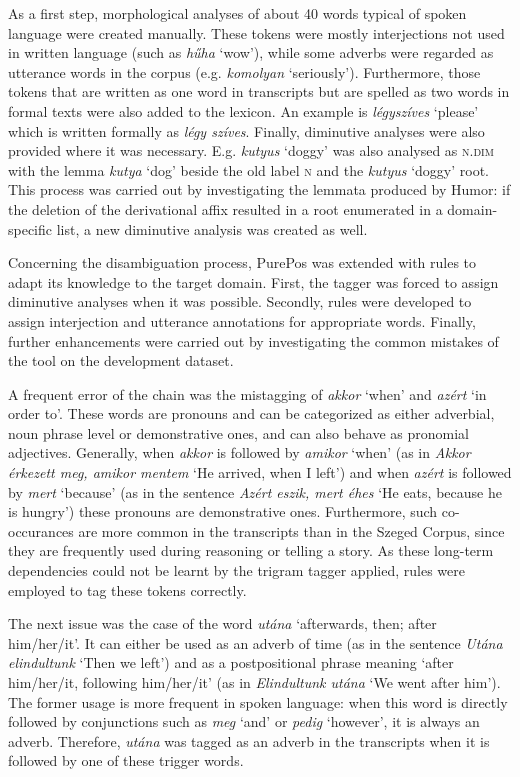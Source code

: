 As a first step, morphological analyses of about 40 words typical of spoken language were created manually. 
These tokens were mostly interjections not used in written language (such as \textit{hűha} `wow’), while some adverbs were regarded as utterance words in the corpus (e.g. \textit{komolyan} `seriously’). 
Furthermore, those tokens that are written as one word in transcripts but are spelled as two words in formal texts were also added to the lexicon. 
An example is \textit{légyszíves} `please’ which is written formally as \textit{légy szíves}. Finally, diminutive analyses were also provided where it was necessary. 
E.g. \textit{kutyus} `doggy’ was also analysed as \textsc{n.dim} with the lemma \textit{kutya} `dog’ beside the old label \textsc{n} and the \textit{kutyus} `doggy’ root. This process was carried out by investigating the lemmata produced by Humor: if the deletion of the derivational affix resulted in a root enumerated in a domain-specific list, a new diminutive analysis was created as well. 

Concerning the disambiguation process, PurePos was extended with rules to adapt its knowledge to the target domain. 
First, the tagger was forced to assign diminutive analyses when it was possible. 
Secondly, rules were developed to assign interjection and utterance annotations for appropriate words.
Finally, further enhancements were carried out by investigating the common mistakes of the tool on the development dataset.

A frequent error of the chain was the mistagging of \textit{akkor} `when’ and \textit{azért} `in order to’. 
These words are pronouns and can be categorized as either adverbial, noun phrase level or demonstrative ones, and can also behave as pronomial adjectives. 
Generally, when \textit{akkor} is followed by \textit{amikor} `when’ (as in \textit{Akkor érkezett meg, amikor mentem} `He arrived, when I left’) and when \textit{azért} is followed by \textit{mert} `because’ (as in the sentence \textit{Azért eszik, mert éhes} `He eats, because he is hungry’) these pronouns are demonstrative ones. 
Furthermore, such co-occurances are more common in the transcripts than in the Szeged Corpus, since they are frequently used during reasoning or telling a story. 
As these long-term dependencies could not be learnt by the trigram tagger applied, rules were employed to tag these tokens correctly.

The next issue was the case of the word \textit{utána} `afterwards, then; after him/her/it’. 
It can either be used as an adverb of time (as in the sentence \textit{Utána elindultunk} `Then we left’) and as a postpositional phrase meaning `after him/her/it, following him/her/it’ (as in \textit{Elindultunk utána} `We went after him’). 
The former usage is more frequent in spoken language: when this word is directly followed by conjunctions such as \textit{meg} `and’ or \textit{pedig} `however’, it is always an adverb. 
Therefore, \textit{utána} was tagged as an adverb in the transcripts when it is followed by one of these trigger words. 

